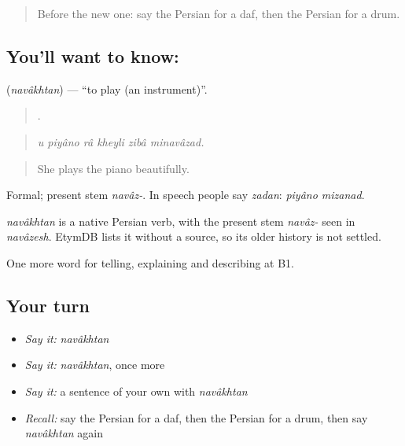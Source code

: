 \label{lesson:FA-C518-navakhtan}



\begin{quote}
Before the new one: say the Persian for a daf, then the Persian for a drum.
\end{quote}

\subsection*{You'll want to know: }
\textbf{} (\emph{navâkhtan}) — \textquotedblleft{}to play (an instrument)\textquotedblright{}.

\begin{quote}
     .
\end{quote}

\begin{quote}
\emph{u piyâno râ kheyli zibâ minavâzad.}
\end{quote}

\begin{quote}
She plays the piano beautifully.
\end{quote}

Formal; present stem \emph{navâz-}. In speech people say \emph{zadan}: \emph{piyâno mizanad}.

\begin{cousinweb}
\emph{navâkhtan} is a native Persian verb, with the present stem \emph{navâz-} seen in \emph{navâzesh}. EtymDB lists it without a source, so its older history is not settled.
\end{cousinweb}

\begin{grammarlens}[title={What you've built}]
One more word for telling, explaining and describing at B1.
\end{grammarlens}

\subsection*{Your turn}
\begin{itemize}
\raggedright
  \item \emph{Say it:} \emph{navâkhtan}
  \item \emph{Say it:} \emph{navâkhtan}, once more
  \item \emph{Say it:} a sentence of your own with \emph{navâkhtan}
  \item \emph{Recall:} say the Persian for a daf, then the Persian for a drum, then say \emph{navâkhtan} again
\end{itemize}

